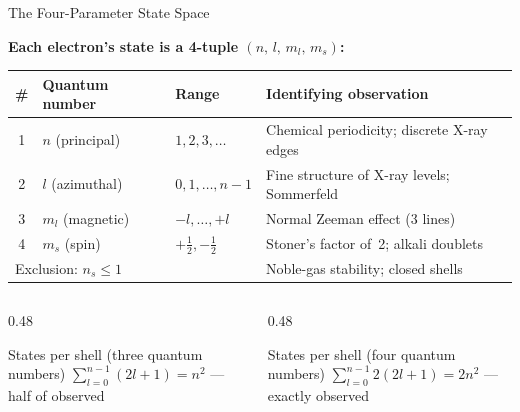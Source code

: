 \documentclass[aspectratio=169,12pt]{beamer}
\begin{document}
\begin{frame}[shrink=20]{The Four-Parameter State Space}

\textbf{Each electron's state is a 4-tuple $(n,\,l,\,m_l,\,m_s)$:}

\medskip
\begin{center}
\renewcommand{\arraystretch}{1.2}
\begin{tabular}{clp{4.5cm}p{4.5cm}}
\toprule
\# & Quantum number & Range & Identifying observation \\
\midrule
1 & $n$ (principal) & $1,2,3,\ldots$ & Chemical periodicity; discrete X-ray edges \\
2 & $l$ (azimuthal) & $0,1,\ldots,n-1$ & Fine structure of X-ray levels; Sommerfeld \\
3 & $m_l$ (magnetic) & $-l,\ldots,+l$ & Normal Zeeman effect (3 lines) \\
4 & $m_s$ (spin) & $+\tfrac{1}{2},-\tfrac{1}{2}$ & Stoner's factor of~2; alkali doublets \\
\midrule
\multicolumn{2}{l}{Exclusion: $n_s \leq 1$} & & Noble-gas stability; closed shells \\
\bottomrule
\end{tabular}
\end{center}

\bigskip
\begin{columns}[T]
\begin{column}{0.48\textwidth}
\begin{block}{States per shell (three quantum numbers)}
$\displaystyle\sum_{l=0}^{n-1}(2l+1) = n^2$
\quad\textcolor{datared}{--- half of observed}
\end{block}
\end{column}
\begin{column}{0.48\textwidth}
\begin{alertblock}{States per shell (four quantum numbers)}
$\displaystyle\sum_{l=0}^{n-1}2(2l+1) = 2n^2$
\quad\textcolor{mlgreen}{--- exactly observed}
\end{alertblock}
\end{column}
\end{columns}

\end{frame}
\end{document}
